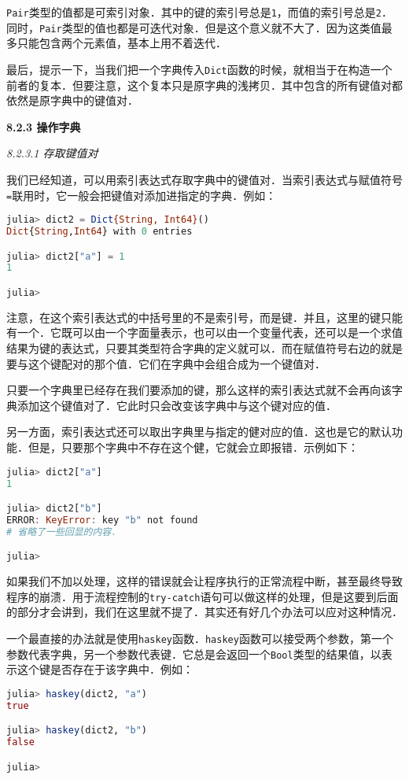 \verb|Pair|类型的值都是可索引对象．其中的键的索引号总是\verb|1|，而值的索引号总是\verb|2|．同时，\verb|Pair|类型的值也都是可迭代对象．但是这个意义就不大了．因为这类值最多只能包含两个元素值，基本上用不着迭代．

最后，提示一下，当我们把一个字典传入\verb|Dict|函数的时候，就相当于在构造一个前者的复本．但要注意，这个复本只是原字典的浅拷贝．其中包含的所有键值对都依然是原字典中的键值对．

\textbf{8.2.3 操作字典}

\textsl{8.2.3.1 存取键值对}

我们已经知道，可以用索引表达式存取字典中的键值对．当索引表达式与赋值符号\verb|=|联用时，它一般会把键值对添加进指定的字典．例如：
\begin{lstlisting}[language=julia]
julia> dict2 = Dict{String, Int64}()
Dict{String,Int64} with 0 entries

julia> dict2["a"] = 1
1

julia> 
\end{lstlisting}

注意，在这个索引表达式的中括号里的不是索引号，而是键．并且，这里的键只能有一个．它既可以由一个字面量表示，也可以由一个变量代表，还可以是一个求值结果为键的表达式，只要其类型符合字典的定义就可以．而在赋值符号右边的就是要与这个键配对的那个值．它们在字典中会组合成为一个键值对．

只要一个字典里已经存在我们要添加的键，那么这样的索引表达式就不会再向该字典添加这个键值对了．它此时只会改变该字典中与这个键对应的值．

另一方面，索引表达式还可以取出字典里与指定的健对应的值．这也是它的默认功能．但是，只要那个字典中不存在这个健，它就会立即报错．示例如下：
\begin{lstlisting}[language=julia]
julia> dict2["a"]
1

julia> dict2["b"]
ERROR: KeyError: key "b" not found
# 省略了一些回显的内容．

julia> 
\end{lstlisting}

如果我们不加以处理，这样的错误就会让程序执行的正常流程中断，甚至最终导致程序的崩溃．用于流程控制的\verb|try-catch|语句可以做这样的处理，但是这要到后面的部分才会讲到，我们在这里就不提了．其实还有好几个办法可以应对这种情况．

一个最直接的办法就是使用\verb|haskey|函数．\verb|haskey|函数可以接受两个参数，第一个参数代表字典，另一个参数代表键．它总是会返回一个\verb|Bool|类型的结果值，以表示这个键是否存在于该字典中．例如：
\begin{lstlisting}[language=julia]
julia> haskey(dict2, "a")
true

julia> haskey(dict2, "b")
false

julia>
\end{lstlisting}

